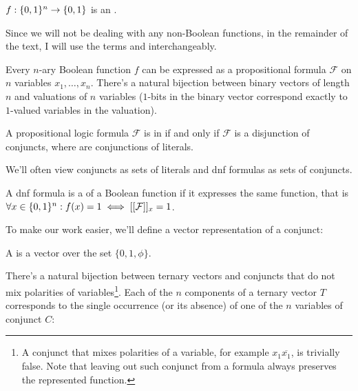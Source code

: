 \begin{definition}
$f: \{0, 1\}^n \rightarrow \{0, 1\}$ is
an .
\end{definition}

Since we will not be dealing with any non-Boolean functions,
in the remainder of the text,
I will use the terms
 and 
interchangeably.

Every $n$-ary Boolean function $f$ can be expressed
as a propositional formula $\mathcal{F}$ on $n$ variables
$x_1, \ldots, x_n$.
There's a natural bijection
between binary vectors of length $n$
and valuations of $n$ variables
($1$-bits in the binary vector
correspond exactly to $1$-valued variables
in the valuation).


\begin{definition}
A propositional logic formula $\mathcal{F}$
is in  if and only if
$\mathcal{F}$ is a disjunction of conjuncts,
where  are conjunctions of literals.

We'll often view conjuncts as sets of literals
and \acrshort{dnf} formulas as sets of conjuncts.
\end{definition}

A \acrshort{dnf} formula is
a 
of a Boolean function
if it expresses the same function,
that is
$\forall x \in \{0, 1\}^n : f(x) = 1 \iff
[[\mathcal{F}]]_{x} = 1$.

To make our work easier,
we'll define a vector representation of a conjunct:

\begin{definition}
A 
is a vector over the set
$\{0, 1, \phi\}$.
\end{definition}

There's a natural bijection between ternary vectors
and conjuncts that do not mix polarities of variables\footnote{A conjunct
that mixes polarities of a variable,
for example $x_1 \overline{x_1}$,
is trivially false.
Note that leaving out such conjunct from a formula
always preserves the represented function.}.
Each of the $n$ components of a ternary vector $T$
corresponds to the single occurrence (or its absence)
of one of the $n$ variables of conjunct $C$:

